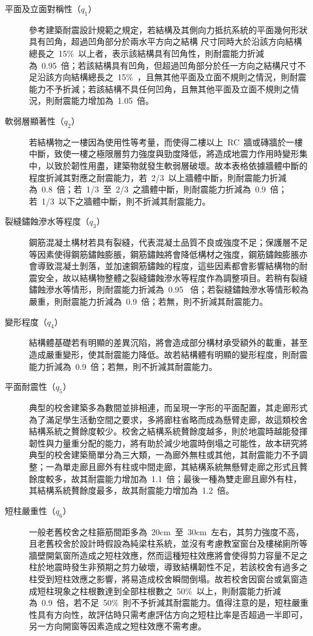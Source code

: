 \begin{description}
  \item[平面及立面對稱性（$q_1$）]
  參考建築耐震設計規範之規定，若結構及其側向力抵抗系統的平面幾何形狀具有凹角，超過凹角部分於兩水平方向之結構 尺寸同時大於沿該方向結構總長之~15\%~以上者，表示該結構具有凹角性，則耐震能力折減為~0.95~倍；若該結構具有凹角，但超過凹角部分於任一方向之結構尺寸不足沿該方向結構總長之~15\%~，且無其他平面及立面不規則之情況，則耐震能力不予折減；若該結構不具任何凹角，且無其他平面及立面不規則之情況，則耐震能力增加為~1.05~倍。
  \item[軟弱層顯著性（$q_2$）]
  若結構物之一樓因為使用性等考量，而使得二樓以上~RC~牆或磚牆於一樓中斷，致使一樓之極限層剪力強度與勁度降低，將造成地震力作用時變形集中，以致於韌性用盡，建築物就發生軟弱層破壞。故本表格依據牆體中斷的程度折減其對應之耐震能力，若~2/3~以上牆體中斷，則耐震能力折減為~0.8~倍；若~1/3~至~2/3~之牆體中斷，則耐震能力折減為~0.9~倍；若~1/3~以下之牆體中斷，則不折減其耐震能力。
  \item[裂縫鏽蝕滲水等程度（$q_3$）]
  鋼筋混凝土構材若具有裂縫，代表混凝土品質不良或強度不足；保護層不足等因素使得鋼筋鏽蝕膨脹，鋼筋鏽蝕將會降低構材之強度，鋼筋鏽蝕膨脹亦會導致混凝土剝落，並加速鋼筋鏽蝕的程度，這些因素都會影響結構物的耐震安全，故以結構物整體之裂縫鏽蝕滲水等程度作為調整項目。若稍有裂縫鏽蝕滲水等情形，則耐震能力折減為~0.95~ 倍；若裂縫鏽蝕滲水等情形較為嚴重，則耐震能力折減為~0.9~倍；若無，則不折減其耐震能力。
  \item[變形程度（$q_4$）]
  結構體基礎若有明顯的差異沉陷，將會造成部分構材承受額外的載重，甚至造成嚴重變形，使其耐震能力降低。故若結構體有明顯的變形程度，則耐震能力折減為~0.9~倍；若無，則不折減其耐震能力。
  \item[平面耐震性（$q_5$）]
  典型的校舍建築多為數間並排相連，而呈現一字形的平面配置，其走廊形式為了滿足學生活動空間之要求，多將廊柱省略而成為懸臂走廊，故這類校舍結構系統之贅餘度較少。校舍之結構系統贅餘度越多，則於地震時越能發揮韌性與力量重分配的能力，將有助於減少地震時倒塌之可能性，故本研究將典型的校舍建築簡單分為三大類，一為廊外無柱或其他，其耐震能力不予調整；一為單走廊且廊外有柱或中間走廊，其結構系統無懸臂走廊之形式且贅餘度較多，故其耐震能力增加為~1.1~倍；最後一種為雙走廊且廊外有柱，其結構系統贅餘度最多，故其耐震能力增加為~1.2~倍。
  \item[短柱嚴重性（$q_6$）]
  一般老舊校舍之柱箍筋間距多為~20cm~至~30cm~左右，其剪力強度不高，且老舊校舍於設計時假設為純梁柱系統，並沒有考慮教室窗台及樓梯廁所等牆壁開氣窗所造成之短柱效應，然而這種短柱效應將會使得剪力容量不足之柱於地震時發生非預期之剪力破壞，導致結構韌性不足，若該校舍有過多之柱受到短柱效應之影響，將易造成校舍瞬間倒塌。故若校舍因窗台或氣窗造成短柱現象之柱根數達到全部柱根數之~50\%~以上，則耐震能力折減為~0.9~倍，若不足~50\%~則不予折減其耐震能力。值得注意的是，短柱嚴重性具有方向性，故評估時只需考慮評估方向之短柱比率是否超過一半即可，另一方向開窗等因素造成之短柱效應不需考慮。
\end{description}


